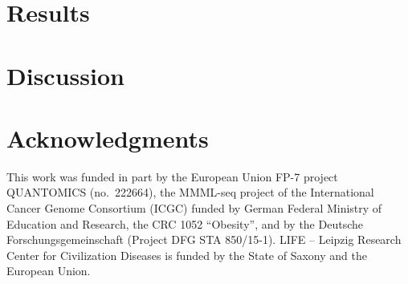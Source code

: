 \documentclass[preprint,3p,times]{elsarticle}
\begin{document}

\section{Results}


\section{Discussion}



\section*{Acknowledgments}

This work was funded in part by the European Union FP-7 project QUANTOMICS
(no.\ 222664), the MMML-seq project of the International Cancer Genome
Consortium (ICGC) funded by German Federal Ministry of Education and
Research, the CRC 1052 ``Obesity'', and by the Deutsche
Forschungsgemeinschaft (Project DFG STA 850/15-1). LIFE -- Leipzig Research
Center for Civilization Diseases is funded by the State of Saxony and the
European Union.



\end{document}
